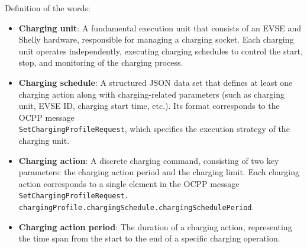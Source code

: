\documentclass[
english,
ruledheaders=section,%
class=report,%
thesis={type=Report},%
accentcolor=9c,%
custommargins=true,%
marginpar=false,%
parskip=half-,%
fontsize=11pt,%
logofile={img/tuda_logo.pdf}, %
]{tudapub}
\begin{document}
    Definition of the words:
    \begin{itemize}
        \item \textbf{Charging unit}: A fundamental execution unit that consists of an EVSE and Shelly hardware, responsible for managing a charging socket. Each charging unit operates independently, executing charging schedules to control the start, stop, and monitoring of the charging process.

        \item \textbf{Charging schedule}: A structured JSON data set that defines at least one charging action along with charging-related parameters (such as charging unit, EVSE ID, charging start time, etc.). Its format corresponds to the OCPP message \\\texttt{SetChargingProfileRequest}, which specifies the execution strategy of the charging unit.

        \item \textbf{Charging action}: A discrete charging command, consisting of two key parameters: the charging action period and the charging limit. Each charging action corresponds to a single element in the OCPP message \texttt{SetChargingProfileRequest.\\chargingProfile.chargingSchedule.chargingSchedulePeriod}.

        \item \textbf{Charging action period}: The duration of a charging action, representing the time span from the start to the end of a specific charging operation.
    \end{itemize}
\end{document}
